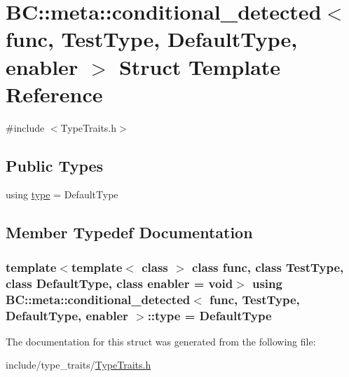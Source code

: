 \hypertarget{structBC_1_1meta_1_1conditional__detected}{}\section{BC\+:\+:meta\+:\+:conditional\+\_\+detected$<$ func, Test\+Type, Default\+Type, enabler $>$ Struct Template Reference}
\label{structBC_1_1meta_1_1conditional__detected}


{\ttfamily \#include $<$Type\+Traits.\+h$>$}

\subsection*{Public Types}
\begin{DoxyCompactItemize}
\item 
using \hyperlink{structBC_1_1meta_1_1conditional__detected_a2f382244ff0e9aab58208b5f68fd1d93}{type} = Default\+Type
\end{DoxyCompactItemize}


\subsection{Member Typedef Documentation}
\subsubsection[{\texorpdfstring{type}{type}}]{\setlength{\rightskip}{0pt plus 5cm}template$<$template$<$ class $>$ class func, class Test\+Type, class Default\+Type, class enabler  = void$>$ using {\bf B\+C\+::meta\+::conditional\+\_\+detected}$<$ func, Test\+Type, Default\+Type, enabler $>$\+::{\bf type} =  Default\+Type}\hypertarget{structBC_1_1meta_1_1conditional__detected_a2f382244ff0e9aab58208b5f68fd1d93}{}\label{structBC_1_1meta_1_1conditional__detected_a2f382244ff0e9aab58208b5f68fd1d93}


The documentation for this struct was generated from the following file\+:\begin{DoxyCompactItemize}
\item 
include/type\+\_\+traits/\hyperlink{TypeTraits_8h}{Type\+Traits.\+h}\end{DoxyCompactItemize}
